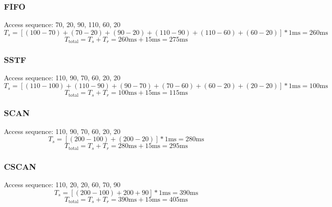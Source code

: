 \documentclass[a4paper,12pt]{article}
\begin{document}
\subsubsection*{FIFO}

Access sequence: 70, 20, 90, 110, 60, 20
\begin{equation*}
	T_s = [(100 - 70) + (70 - 20) + (90 - 20) + (110 - 90) + (110 - 60) + (60 - 20)] * 1 \text{ms} = 260 \text{ms}
\end{equation*}
\begin{equation*}
	T_{\text{total}} = T_s + T_r = 260 \text{ms} + 15 \text{ms} = 275 \text{ms}
\end{equation*}

\subsubsection*{SSTF}

Access sequence: 110, 90, 70, 60, 20, 20
\begin{equation*}
	T_s = [(110 - 100) + (110 - 90) + (90 - 70) + (70 - 60) + (60 - 20) + (20 - 20)] * 1 \text{ms} = 100 \text{ms}
\end{equation*}
\begin{equation*}
	T_{\text{total}} = T_s + T_r = 100 \text{ms} + 15 \text{ms} = 115 \text{ms}
\end{equation*}

\subsubsection*{SCAN}

Access sequence: 110, 90, 70, 60, 20, 20
\begin{equation*}
	T_s = [(200 - 100) + (200 - 20)] * 1 \text{ms} = 280 \text{ms}
\end{equation*}
\begin{equation*}
	T_{\text{total}} = T_s + T_r = 280 \text{ms} + 15 \text{ms} = 295 \text{ms}
\end{equation*}

\subsubsection*{CSCAN}

Access sequence: 110, 20, 20, 60, 70, 90
\begin{equation*}
	T_s = [(200 - 100) + 200 + 90] * 1 \text{ms} = 390 \text{ms}
\end{equation*}
\begin{equation*}
	T_{\text{total}} = T_s + T_r = 390 \text{ms} + 15 \text{ms} = 405 \text{ms}
\end{equation*}
\end{document}
